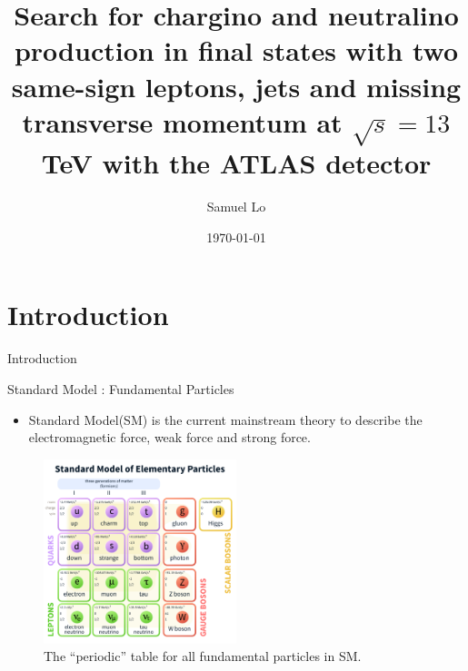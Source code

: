 \documentclass[mathserif,serif]{beamer}
\title[Oral Presentation]{Search for chargino and neutralino production in final states with two same-sign leptons, jets and missing transverse momentum at $\sqrt{s} = 13$ TeV with the ATLAS detector}
\author[]
{
Samuel Lo \inst{1}
}
\institute[]
{
\inst{1}
The University of Hong Kong
}
\date[]{\today}
\begin{document}
\frame{\titlepage}
\frame{\tableofcontents}

\section{Introduction}
\begin{frame}
\begin{center}
\huge
Introduction
\end{center}
\end{frame}

\begin{frame}{Standard Model : Fundamental Particles}
\begin{itemize}
\item Standard Model(SM) is the current mainstream theory to describe the electromagnetic force, weak force and strong force.
\end{itemize}

\begin{figure}
\centering
\includegraphics[width=0.5\textwidth]{data/photo/theory/SM_particles.png}
\caption{The ``periodic'' table for all fundamental particles in SM.}
\end{figure}
\end{frame}
\end{document}
